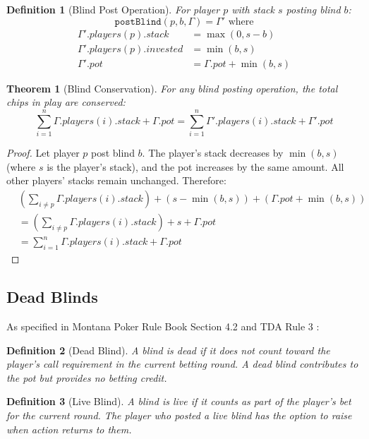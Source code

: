 \documentclass[11pt,a4paper]{article}
\newtheorem{definition}{Definition}[section]
\newtheorem{theorem}{Theorem}[section]
\begin{document}
\begin{definition}[Blind Post Operation]
\label{def:blind-post}
For player $p$ with stack $s$ posting blind $b$:
\[
\texttt{postBlind}(p, b, \Gamma) = \Gamma' \text{ where}
\]
\begin{align*}
\Gamma'.players(p).stack &= \max(0, s - b) \\
\Gamma'.players(p).invested &= \min(b, s) \\
\Gamma'.pot &= \Gamma.pot + \min(b, s)
\end{align*}
\end{definition}

\begin{theorem}[Blind Conservation]
\label{thm:blind-conservation}
For any blind posting operation, the total chips in play are conserved:
\[
\sum_{i=1}^{n} \Gamma.players(i).stack + \Gamma.pot = \sum_{i=1}^{n} \Gamma'.players(i).stack + \Gamma'.pot
\]
\end{theorem}

\begin{proof}
Let player $p$ post blind $b$. The player's stack decreases by $\min(b, s)$ (where $s$ is the player's stack), and the pot increases by the same amount. All other players' stacks remain unchanged. Therefore:
\begin{align*}
&\left(\sum_{i \neq p} \Gamma.players(i).stack\right) + (s - \min(b,s)) + (\Gamma.pot + \min(b,s)) \\
&= \left(\sum_{i \neq p} \Gamma.players(i).stack\right) + s + \Gamma.pot \\
&= \sum_{i=1}^{n} \Gamma.players(i).stack + \Gamma.pot
\end{align*}
\end{proof}

\subsection{Dead Blinds}

As specified in Montana Poker Rule Book Section 4.2 \cite{montana2014poker} and TDA Rule 3 \cite{tda2024rules}:

\begin{definition}[Dead Blind]
\label{def:dead-blind}
A blind is \emph{dead} if it does not count toward the player's call requirement in the current betting round. A dead blind contributes to the pot but provides no betting credit.
\end{definition}

\begin{definition}[Live Blind]
\label{def:live-blind}
A blind is \emph{live} if it counts as part of the player's bet for the current round. The player who posted a live blind has the option to raise when action returns to them.
\end{definition}
\end{document}
